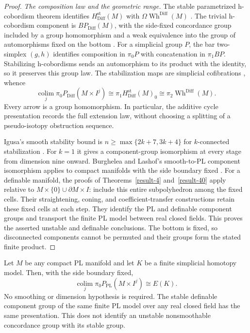\begin{proof}
\emph{The composition law and the geometric range.}
The stable parametrized h-cobordism theorem identifies
$H^{\mathrm{st}}_{\mathrm{Diff}}(M)$ with
$\Omega\operatorname{Wh}^{\mathrm{Diff}}(M)$
\cite[Theorem~0.1, p.~2]{WaldhausenJahrenRognes2013}.
The trivial h-cobordism component is $BP_{\mathrm{Diff}}(M)$,
with the side-fixed concordance group included by a group
homomorphism and a weak equivalence into the group of automorphisms
fixed on the bottom
\cite[Remark~1.1.11 and (1.1.12), p.~12]
{WaldhausenJahrenRognes2013}.
For a simplicial group $P$, the bar two-simplex $(g,h)$ identifies
composition in $\pi_0P$ with concatenation in $\pi_1BP$.
Stabilizing h-cobordisms sends an automorphism to its product with
the identity, so it preserves this group law.  The stabilization maps
are simplicial cofibrations
\cite[Definition~1.1.3, p.~8]{WaldhausenJahrenRognes2013}, whence
\[
 \operatorname*{colim}_j\pi_0P_{\mathrm{Diff}}(M\times I^j)
 \cong\pi_1H^{\mathrm{st}}_{\mathrm{Diff}}(M)_0
 \cong\pi_2\operatorname{Wh}^{\mathrm{Diff}}(M).
\]
Every arrow is a group homomorphism.  In particular, the additive
cycle presentation records the full extension law, without choosing
a splitting of a pseudo-isotopy obstruction sequence.

Igusa's smooth stability bound is
$n\geq\max\{2k+7,3k+4\}$ for $k$-connected stabilization
\cite[Theorem~1.4.1, p.~21]{WaldhausenJahrenRognes2013}.
For $k=1$ it gives a component-group isomorphism at every stage from
dimension nine onward.  Burghelea and Lashof's smooth-to-PL component
isomorphism applies to compact manifolds with the side boundary fixed
\cite[Theorem~6.1 and proof, pp.~41--43]{BurgheleaLashof1974II}.
For a definable manifold, the proofs of Theorems~\ref{result-4}
and~\ref{result-40} apply relative to
$M\times\{0\}\cup\partial M\times I$: include this entire
subpolyhedron among the fixed cells.  Their straightening, coning,
and coefficient-transfer constructions retain these fixed cells at
each step.  They identify the PL and definable component groups and
transport the finite PL model between real closed fields.  This
proves the asserted unstable and definable conclusions.  The bottom
is fixed, so disconnected components cannot be permuted and their
groups form the stated finite product.
\end{proof}

\begin{theorem}\label{thm:stable-pl-component-presentation}
Let $M$ be any compact PL manifold and let $K$ be a finite simplicial
homotopy model.  Then, with the side boundary fixed,
\[
 \operatorname*{colim}_j\pi_0P_{\mathrm{PL}}(M\times I^j)
       \cong E(K).
\]
No smoothing or dimension hypothesis is required.  The stable
definable component group of the same finite PL model over any real
closed field has the same presentation.  This does not identify an
unstable nonsmoothable concordance group with its stable group.
\end{theorem}

